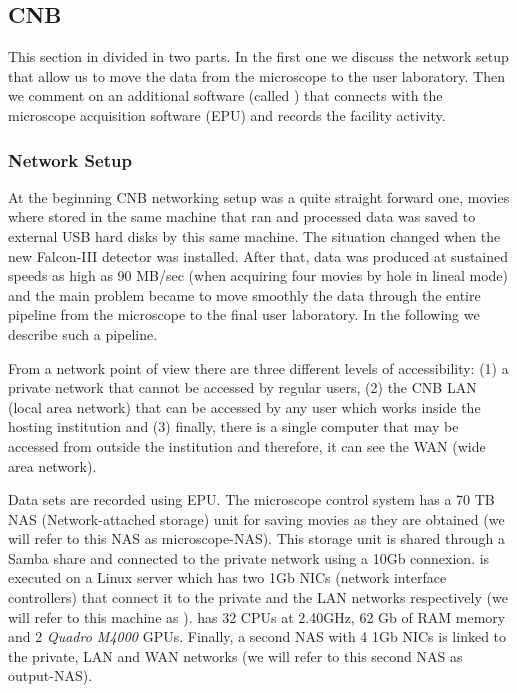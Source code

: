 \subsection{CNB}

This section in divided in two parts. In the first one we discuss the network setup that allow us to move the data from the microscope to the user laboratory. Then  we comment on an additional software (called  \emadmin) that connects \scipion with the microscope acquisition 
software (EPU) and records the facility activity.

\subsubsection{Network Setup}

At the beginning CNB networking setup was a quite straight forward one, movies where stored in the  same machine that ran \scipion and processed data was saved to external USB hard disks by this same machine. The situation changed when the new Falcon-III detector was installed. After that, data was produced at sustained speeds as high as 90 MB/sec (when acquiring four movies by hole in lineal mode) and the main problem became to move smoothly the data through the entire pipeline from the microscope to the final user laboratory. In the following we describe such a pipeline.

From a network point of view there are three different levels of accessibility: (1) a private network that cannot be accessed by regular users, (2) the CNB LAN (local area network)  that can be accessed by any user which works inside the hosting  institution and (3) finally, there is a single computer that may be accessed from outside the institution and therefore, it can see the WAN (wide area network).

Data sets are recorded using EPU. The microscope control system has a 70 TB NAS (Network-attached storage) unit for saving movies as they are obtained (we will refer to this NAS as microscope-NAS). This storage unit is shared through a Samba share and connected to the private network using a 10Gb connexion. \scipion is executed on a Linux server which has two 1Gb NICs (network interface controllers) that connect it to the private and the LAN networks respectively (we will refer to this machine as \scipionbox). \scipionbox has 32 CPUs at 2.40GHz, 62 Gb of RAM memory and 2 \textit{Quadro M4000} GPUs. Finally, a second NAS with 4 1Gb NICs is linked to the private, LAN and WAN networks (we will refer to this second NAS as output-NAS).

